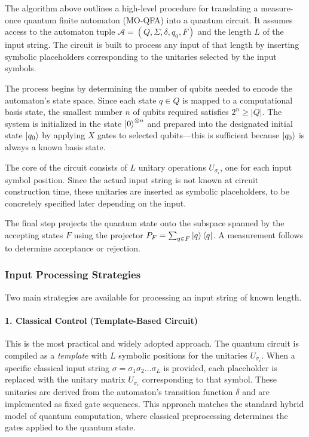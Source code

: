 \noindent
The algorithm above outlines a high-level procedure for translating a measure-once quantum finite automaton (MO-QFA) into a quantum circuit. It assumes access to the automaton tuple $\mathcal{A} = (Q, \Sigma, \delta, q_0, F)$ and the length $L$ of the input string. The circuit is built to process any input of that length by inserting symbolic placeholders corresponding to the unitaries selected by the input symbols.

The process begins by determining the number of qubits needed to encode the automaton's state space. Since each state $q \in Q$ is mapped to a computational basis state, the smallest number $n$ of qubits required satisfies $2^n \geq |Q|$. The system is initialized in the state $\ket{0}^{\otimes n}$ and prepared into the designated initial state $\ket{q_0}$ by applying $X$ gates to selected qubits—this is sufficient because $\ket{q_0}$ is always a known basis state.

The core of the circuit consists of $L$ unitary operations $U_{\sigma_i}$, one for each input symbol position. Since the actual input string is not known at circuit construction time, these unitaries are inserted as symbolic placeholders, to be concretely specified later depending on the input.

The final step projects the quantum state onto the subspace spanned by the accepting states $F$ using the projector $P_F = \sum_{q \in F} \ket{q}\bra{q}$. A measurement follows to determine acceptance or rejection.

\subsubsection*{Input Processing Strategies}

Two main strategies are available for processing an input string of known length.

\paragraph{1. Classical Control (Template-Based Circuit)}
This is the most practical and widely adopted approach. The quantum circuit is compiled as a \emph{template} with $L$ symbolic positions for the unitaries $U_{\sigma_i}$. When a specific classical input string $\sigma = \sigma_1 \sigma_2 \ldots \sigma_L$ is provided, each placeholder is replaced with the unitary matrix $U_{\sigma_i}$ corresponding to that symbol. These unitaries are derived from the automaton's transition function $\delta$ and are implemented as fixed gate sequences. This approach matches the standard hybrid model of quantum computation, where classical preprocessing determines the gates applied to the quantum state.

